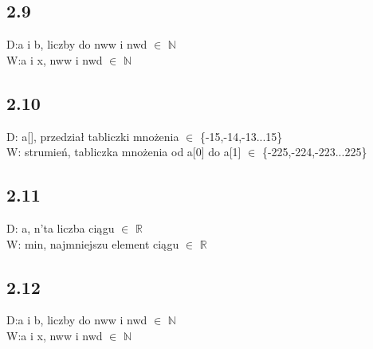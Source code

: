 \documentclass[a4paper,twoside,7pt]{book}
\begin{document}
\subsection*{2.9}
\begin{multicols}{2}
  \begin{flushleft}

    \end{flushleft}
D:a i b, liczby do nww i nwd $\in$ $\mathbb{N}$\\
W:a i x, nww i nwd $\in$ $\mathbb{N}$
    \begin{flushright}
    
    \end{flushright}    
\end{multicols}

\subsection*{2.10}
\begin{multicols}{2}
  \begin{flushleft}

    \end{flushleft}
D: a[], przedział tabliczki mnożenia $\in$ \{-15,-14,-13...15\}\\
W: strumień, tabliczka mnożenia od a[0] do a[1] $\in$ \{-225,-224,-223...225\}
    \begin{flushright}
    
    \end{flushright}    
\end{multicols}
\newpage

\subsection*{2.11}
\begin{multicols}{2}
  \begin{flushleft}

    \end{flushleft}
D: a, n'ta liczba ciągu $\in$ $\mathbb{R}$\\
W: min, najmniejszu element ciągu $\in$ $\mathbb{R}$
    \begin{flushright}
    
    \end{flushright}    
\end{multicols}

\subsection*{2.12}
\begin{multicols}{2}
  \begin{flushleft}

    \end{flushleft}
D:a i b, liczby do nww i nwd $\in$ $\mathbb{N}$\\
W:a i x, nww i nwd $\in$ $\mathbb{N}$
    \begin{flushright}
    
    \end{flushright}    
\end{multicols}
\newpage
\end{document}
